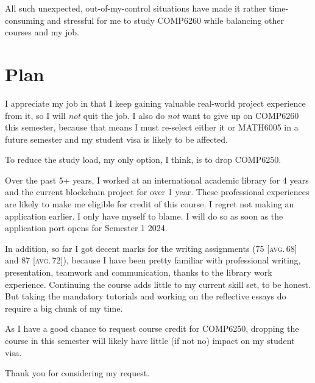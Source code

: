 \documentclass[12pt,a4paper]{article}
\begin{document}
All such unexpected, out-of-my-control situations have made it rather time-consuming and stressful for me to study COMP6260 while balancing other courses and my job.


\section{Plan}
I appreciate my job in that I keep gaining valuable real-world project experience from it, so I will \emph{not} quit the job.  I also do \emph{not} want to give up on COMP6260 this semester, because that means I must re-select either it or MATH6005 in a future semester and my student visa is likely to be affected.

To reduce the study load, my only option, I think, is to drop COMP6250.

Over the past 5+ years, I worked at an international academic library for 4 years and the current blockchain project for over 1 year.  These professional experiences are likely to make me eligible for credit of this course.  I regret not making an application earlier.  I only have myself to blame.  I will do so as soon as the application port opens for Semester 1 2024.

In addition, so far I got decent marks for the writing assignments (75 [\textsc{avg.}\,68] and 87 [\textsc{avg.}\,72]), because I have been pretty familiar with professional writing, presentation, teamwork and communication, thanks to the library work experience.  Continuing the course adds little to my current skill set, to be honest. But taking the mandatory tutorials and working on the reflective essays do require a big chunk of my time.

As I have a good chance to request course credit for COMP6250, dropping the course in this semester will likely have little (if not no) impact on my student visa.


Thank you for considering my request.
\end{document}
